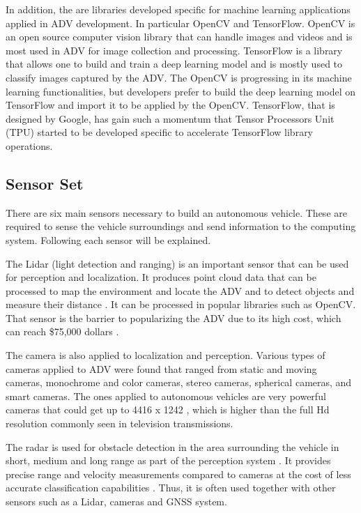  In addition, the are libraries developed specific for machine learning applications applied in ADV development. In particular OpenCV and TensorFlow. OpenCV is an open source computer vision library that can handle images and videos \cite{jain2018} and is most used in ADV for image collection and processing. TensorFlow is a library that allows one to build and train a deep learning model \cite{chaitra2020} and is mostly used to classify images captured by the ADV. The OpenCV is progressing in its machine learning functionalities, but developers prefer to build the deep learning model on TensorFlow and import it to be applied by the OpenCV. TensorFlow, that is designed by Google, has gain such a momentum that Tensor Processors Unit (TPU) started to be developed specific to accelerate TensorFlow library operations. \cite{TensorFlow}


\subsection{Sensor Set}

There are six main sensors necessary to build an autonomous vehicle. These are required to sense the vehicle surroundings and send information to the computing system. Following each sensor will be explained.

The Lidar (light detection and ranging) is an important sensor that can be used for perception and localization. It produces point cloud data that can be processed to map the environment and locate the ADV and to detect objects and measure their distance \cite{Kato2015}.  It can be processed in popular libraries such as OpenCV. That sensor is the barrier to popularizing the ADV due to its high cost, which can reach \$75,000 dollars \cite{Lin2018}.

The camera is also applied to localization and perception. Various types of cameras applied to ADV were found that ranged from static and moving cameras, monochrome and color cameras, stereo cameras, spherical cameras, and smart cameras. The ones applied to autonomous vehicles are very powerful cameras that could get up to 4416 x 1242 \cite{Karaman2017}, which is higher than the full Hd resolution commonly seen in television transmissions.

The radar is used for obstacle detection in the area surrounding the vehicle in short, medium and long range as part of the perception system \cite{Tas2018a}. It provides precise range and velocity measurements compared to cameras at the cost of less accurate classification capabilities \cite{Kunz2015}. Thus, it is often used together with other sensors such as a Lidar, cameras and GNSS system.

